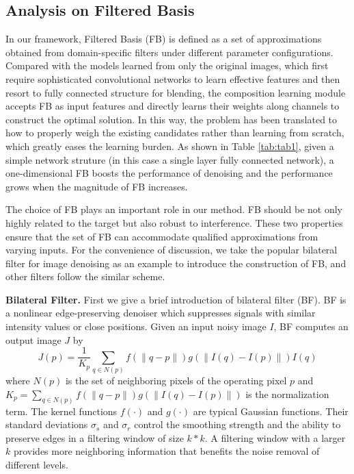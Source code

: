 \documentclass[twocolumn]{svjour3}          %
\begin{document}
\subsection{Analysis on Filtered Basis}
In our framework, Filtered Basis (FB) is defined as a set of approximations obtained from domain-specific filters under different parameter configurations. Compared with the models learned from only the original images, which first require sophisticated convolutional networks to learn effective features and then resort to fully connected structure for blending, the composition learning module accepts FB as input features and directly learns their weights along channels to construct the optimal solution. In this way, the problem has been translated to how to properly weigh the existing candidates rather than learning from scratch, which greatly eases the learning burden. As shown in Table \ref{tab:tab1}, given a simple network struture (in this case a single layer fully connected network), a one-dimensional FB boosts the performance of denoising and the performance grows when the magnitude of FB increases.

The choice of FB plays an important role in our method. FB should be not only highly related to the target but also robust to interference. These two properties ensure that the set of FB can accommodate qualified approximations from varying inputs. For the convenience of discussion, we take the popular bilateral filter for image denoising as an example to introduce the construction of FB, and other filters follow the similar scheme.

\textbf{Bilateral Filter.}
First we give a brief introduction of bilateral filter (BF). BF is a nonlinear edge-preserving denoiser which suppresses signals with similar intensity values or close positions. Given an input noisy image $I$, BF computes an output image $J$ by
\begin{equation}
	J(p)=\frac{1}{K_{p}} \sum_{q \in N(p)}f(\|q-p\|)g(\|I(q)-I(p)\|) I(q)
\end{equation}
where $N(p)$ is the set of neighboring pixels of the operating pixel $p$ and $K_{p}=\sum_{q \in N(p)} f(\|q-p\|)g(\|I(q)-I(p)\|)$ is the normalization term. The kernel functions $f(\cdot)$ and $g(\cdot)$ are typical Gaussian functions. Their standard deviations  $\sigma_{s}$ and $\sigma_{r}$ control the smoothing strength and the ability to preserve edges in a filtering window of size $k*k$. A filtering window with a larger $k$ provides more neighboring information that benefits the noise removal of different levels.
\end{document}
